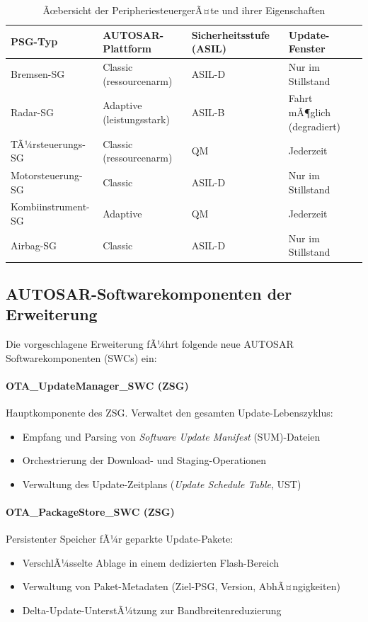 ﻿\documentclass[12pt,a4paper,twoside]{article}
\begin{document}
\begin{table}[htbp]
  \centering
  \caption{Ãœbersicht der PeripheriesteuergerÃ¤te und ihrer Eigenschaften}
  \label{tab:psgs}
  \begin{tabularx}{\textwidth}{lXXX}
    \toprule
    \textbf{PSG-Typ} & \textbf{AUTOSAR-Plattform} &
    \textbf{Sicherheitsstufe (ASIL)} & \textbf{Update-Fenster} \\
    \midrule
    Bremsen-SG & Classic (ressourcenarm) & ASIL-D & Nur im Stillstand \\
    Radar-SG & Adaptive (leistungsstark) & ASIL-B & Fahrt mÃ¶glich (degradiert) \\
    TÃ¼rsteuerungs-SG & Classic (ressourcenarm) & QM & Jederzeit \\
    Motorsteuerung-SG & Classic & ASIL-D & Nur im Stillstand \\
    Kombiinstrument-SG & Adaptive & QM & Jederzeit \\
    Airbag-SG & Classic & ASIL-D & Nur im Stillstand \\
    \bottomrule
  \end{tabularx}
\end{table}

\subsection{AUTOSAR-Softwarekomponenten der Erweiterung}
\label{subsec:swc}

Die vorgeschlagene Erweiterung fÃ¼hrt folgende neue AUTOSAR
Softwarekomponenten (SWCs) ein:

\paragraph{OTA\_UpdateManager\_SWC (ZSG)}
Hauptkomponente des ZSG. Verwaltet den gesamten Update-Lebenszyklus:
\begin{itemize}
  \item Empfang und Parsing von \textit{Software Update Manifest} (SUM)-Dateien
  \item Orchestrierung der Download- und Staging-Operationen
  \item Verwaltung des Update-Zeitplans (\textit{Update Schedule Table}, UST)
\end{itemize}

\paragraph{OTA\_PackageStore\_SWC (ZSG)}
Persistenter Speicher fÃ¼r geparkte Update-Pakete:
\begin{itemize}
  \item VerschlÃ¼sselte Ablage in einem dedizierten Flash-Bereich
  \item Verwaltung von Paket-Metadaten (Ziel-PSG, Version, AbhÃ¤ngigkeiten)
  \item Delta-Update-UnterstÃ¼tzung zur Bandbreitenreduzierung
\end{itemize}
\end{document}
